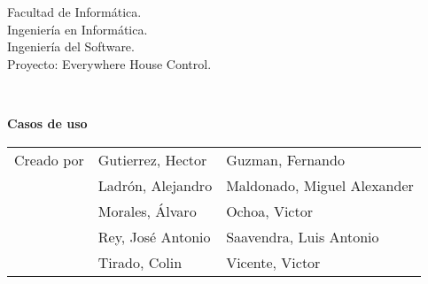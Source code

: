 \begin{titlepage}
    \begin{scriptsize}\noindent Facultad de Informática.\\
        Ingeniería en Informática.\\
        Ingeniería del Software.\\
        Proyecto: Everywhere House Control.
    \end{scriptsize}\\
    \vfill
    \begin{center}
        \begin{Large}
            \textbf{Casos de uso}
        \end{Large}
    \end{center}
    \vfill
    \begin{flushright}
        \begin{scriptsize}
            \begin{tabular}{lll}
            Creado por & Gutierrez, Hector & Guzman, Fernando  \\
                 & Ladrón, Alejandro & Maldonado, Miguel Alexander \\
                 & Morales, Álvaro & Ochoa, Victor \\
                 & Rey, José Antonio & Saavendra, Luis Antonio  \\
                 & Tirado, Colin & Vicente, Victor \\
            \end{tabular}
        \end{scriptsize}
    \end{flushright}
\end{titlepage}
\thispagestyle{empty}
\cleardoublepage
\newpage

\tableofcontents
\newpage
\thispagestyle{empty}
\cleardoublepage
\newpage
{}
\raggedbottom
{}

























